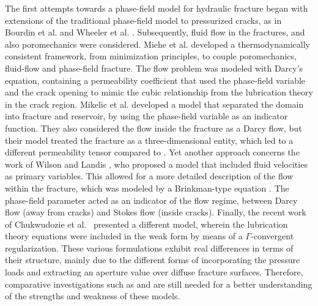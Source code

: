     The first attempts towards a phase-field model for hydraulic fracture began with extensions of the traditional phase-field model \cite{francfort1998revisiting,bourdin2000numerical} to pressurized cracks, as in Bourdin et al. \cite{bourdin2012variational} and Wheeler et al. \cite{wheeler2014augmented}. Subsequently, fluid flow in the fractures, and also poromechanics were considered. Miehe et al. \cite{miehe2015minimization, miehe2016phase} developed a thermodynamically consistent framework, from minimization principles, to couple poromechanics, fluid-flow and phase-field fracture. The flow problem was modeled with Darcy's equation, containing a permeability coefficient that used the phase-field variable and the crack opening to mimic the cubic relationship from the lubrication theory in the crack region. Mikelic et al. \cite{mikelic2015phase1, mikelic2015phase2} developed a model that separated the domain into fracture and reservoir, by using the phase-field variable as an indicator function. They also considered the flow inside the fracture as a Darcy flow, but their model treated the fracture as a three-dimensional entity, which led to a different permeability tensor compared to \cite{miehe2015minimization, miehe2016phase}.  Yet another approach concerns the work of Wilson and Landis \cite{wilson2016phase}, who proposed a model that included fluid velocities as primary variables. This allowed for a more detailed description of the flow within the fracture, which was modeled by a Brinkman-type equation \cite{brinkman1949calculation}. The phase-field parameter acted as an indicator of the flow regime, between Darcy flow (away from cracks) and Stokes flow (inside cracks).  Finally, the recent work of Chukwudozie et al.\ \cite{chukwudozie2019variational} presented a different model, wherein the lubrication theory equations were included in the weak form by means of a $\Gamma$-convergent regularization. These various formulations exhibit real differences in terms of their structure, mainly due to the different forms of incorporating the pressure loads and extracting an aperture value over diffuse fracture surfaces. Therefore, comparative investigations such as \cite{chen2020phase} and \cite{yoshioka2020crack} are still needed for a better understanding of the strengths and weakness of these models.
    
